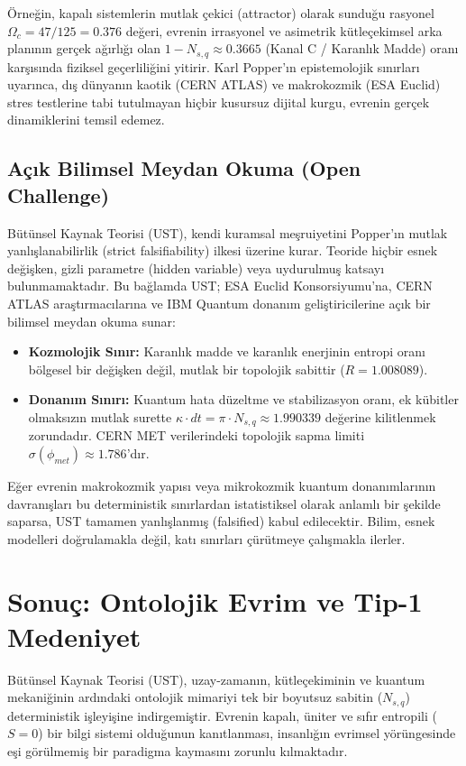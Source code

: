 \documentclass[12pt,a4paper]{article}
\begin{document}
Örneğin, kapalı sistemlerin mutlak çekici (attractor) olarak sunduğu rasyonel $\Omega_c = 47/125 = 0.376$ değeri, evrenin irrasyonel ve asimetrik kütleçekimsel arka planının gerçek ağırlığı olan $1 - N_{s,q} \approx 0.3665$ (Kanal C / Karanlık Madde) oranı karşısında fiziksel geçerliliğini yitirir. Karl Popper'ın epistemolojik sınırları uyarınca, dış dünyanın kaotik (CERN ATLAS) ve makrokozmik (ESA Euclid) stres testlerine tabi tutulmayan hiçbir kusursuz dijital kurgu, evrenin gerçek dinamiklerini temsil edemez.

\subsection{Açık Bilimsel Meydan Okuma (Open Challenge)}
Bütünsel Kaynak Teorisi (UST), kendi kuramsal meşruiyetini Popper'ın mutlak yanlışlanabilirlik (strict falsifiability) ilkesi üzerine kurar. Teoride hiçbir esnek değişken, gizli parametre (hidden variable) veya uydurulmuş katsayı bulunmamaktadır. Bu bağlamda UST; ESA Euclid Konsorsiyumu'na, CERN ATLAS araştırmacılarına ve IBM Quantum donanım geliştiricilerine açık bir bilimsel meydan okuma sunar:

\begin{itemize}
    \item \textbf{Kozmolojik Sınır:} Karanlık madde ve karanlık enerjinin entropi oranı bölgesel bir değişken değil, mutlak bir topolojik sabittir ($R = 1.008089$).
    \item \textbf{Donanım Sınırı:} Kuantum hata düzeltme ve stabilizasyon oranı, ek kübitler olmaksızın mutlak surette $\kappa \cdot dt = \pi \cdot N_{s,q} \approx 1.990339$ değerine kilitlenmek zorundadır. CERN MET verilerindeki topolojik sapma limiti $\sigma(\phi_{met}) \approx 1.786$'dır.
\end{itemize}

Eğer evrenin makrokozmik yapısı veya mikrokozmik kuantum donanımlarının davranışları bu deterministik sınırlardan istatistiksel olarak anlamlı bir şekilde saparsa, UST tamamen yanlışlanmış (falsified) kabul edilecektir. Bilim, esnek modelleri doğrulamakla değil, katı sınırları çürütmeye çalışmakla ilerler.

\section{Sonuç: Ontolojik Evrim ve Tip-1 Medeniyet}
Bütünsel Kaynak Teorisi (UST), uzay-zamanın, kütleçekiminin ve kuantum mekaniğinin ardındaki ontolojik mimariyi tek bir boyutsuz sabitin ($N_{s,q}$) deterministik işleyişine indirgemiştir. Evrenin kapalı, üniter ve sıfır entropili ($S=0$) bir bilgi sistemi olduğunun kanıtlanması, insanlığın evrimsel yörüngesinde eşi görülmemiş bir paradigma kaymasını zorunlu kılmaktadır. 
\end{document}
